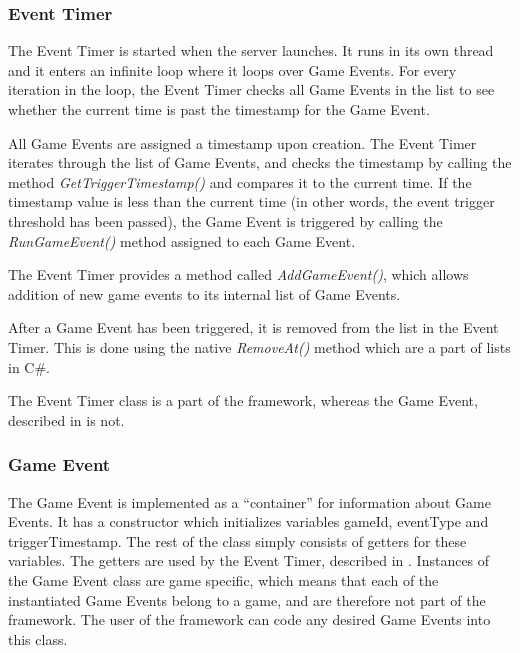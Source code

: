 \subsubsection{Event Timer}
\label{sec:eventtimerimpl}
The Event Timer is started when the server launches. It runs in its own thread and it enters an infinite loop where it loops over Game Events. For every iteration in the loop, the Event Timer checks all Game Events in the list to see whether the current time is past the timestamp for the Game Event. 

All Game Events are assigned a timestamp upon creation. The Event Timer iterates through the list of Game Events, and checks the timestamp by calling the method \textit{GetTriggerTimestamp()} and compares it to the current time. If the timestamp value is less than the current time (in other words, the event trigger threshold has been passed), the Game Event is triggered by calling the \textit{RunGameEvent()} method assigned to each Game Event. 

The Event Timer provides a method called \textit{AddGameEvent()}, which allows addition of new game events to its internal list of Game Events.

After a Game Event has been triggered, it is removed from the list in the Event Timer. This is done using the native \textit{RemoveAt()} method which are a part of lists in C\#.

The Event Timer class is a part of the framework, whereas the Game Event, described in  is not.

\subsubsection{Game Event}\label{subsec:geventImpl}
The Game Event is implemented as a ``container'' for information about Game Events. It has a constructor which initializes variables gameId, eventType and triggerTimestamp. The rest of the class simply consists of getters for these variables. The getters are used by the Event Timer, described in . Instances of the Game Event class are game specific, which means that each of the instantiated Game Events belong to a game, and are therefore not part of the framework. The user of the framework can code any desired Game Events into this class.
